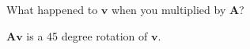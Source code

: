 What happened to $\boldsymbol{v}$ when you multiplied by $\boldsymbol{A}$?

\begin{solution}
$\boldsymbol{Av}$ is a 45 degree rotation of $\boldsymbol{v}$.
\end{solution}